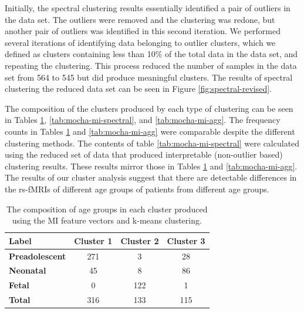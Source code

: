 Initially, the spectral clustering results essentially identified a pair of outliers in the data set. The outliers were removed and the clustering was redone, but another pair of outliers was identified in this second iteration. We performed several iterations of identifying data belonging to outlier clusters, which we defined as clusters containing less than 10\% of the total data in the data set, and repeating the clustering. This process reduced the number of samples in the data set from 564 to 545 but did produce meaningful clusters. The results of spectral clustering the reduced data set can be seen in Figure \ref{fig:spectral-revised}. 

The composition of the clusters produced by each type of clustering can be seen in Tables \ref{tab:mocha-mi-kmeans}, \ref{tab:mocha-mi-spectral}, and \ref{tab:mocha-mi-agg}. The frequency counts in Tables \ref{tab:mocha-mi-kmeans} and \ref{tab:mocha-mi-agg} were comparable despite the different clustering methods. The contents of table \ref{tab:mocha-mi-spectral} were calculated using the reduced set of data that produced interpretable (non-outlier based) clustering results. These results mirror those in Tables \ref{tab:mocha-mi-kmeans} and \ref{tab:mocha-mi-agg}. The results of our cluster analysis suggest that there are detectable differences in the rs-fMRIs of different age groups of patients from different age groups.

\clearpage

\begin{table}
\centering
\caption{The composition of age groups in each cluster produced using the MI feature vectors and k-means clustering.}
\label{tab:mocha-mi-kmeans}
\begin{tabular}{|l|c|c|c|}
\hline
\textbf{Label} & \multicolumn{1}{l|}{\textbf{Cluster 1}} & \multicolumn{1}{l|}{\textbf{Cluster 2}} & \multicolumn{1}{l|}{\textbf{Cluster 3}} \\ \hline
\textbf{Preadolescent} & 271 & 3   & 28  \\ \hline
\textbf{Neonatal}      & 45  & 8   & 86  \\ \hline
\textbf{Fetal}         & 0   & 122 & 1   \\ \hline
\textbf{Total}         & 316 & 133 & 115 \\ \hline
\end{tabular}
\end{table}

